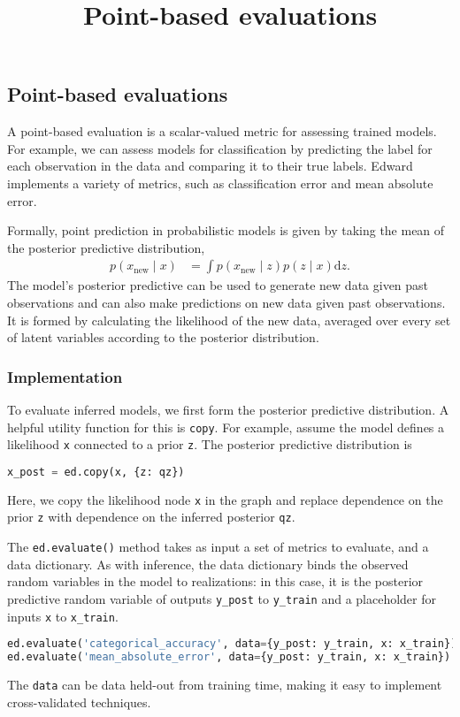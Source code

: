 \title{Point-based evaluations}

\subsection{Point-based evaluations}

A point-based evaluation is a scalar-valued metric for assessing
trained models. For example, we can assess models for classification
by predicting the label for each observation in the data and comparing
it to their true labels. Edward implements a variety of metrics, such
as classification error and mean absolute error.

Formally, point prediction in probabilistic models is given by
taking the mean of the posterior predictive distribution,
\begin{align*}
  p(x_\text{new} \mid x)
  &=
  \int
  p(x_\text{new} \mid z)
  p(z \mid x)
  \text{d} z.
\end{align*}
The model's posterior predictive can be used to generate new data
given past observations and can also make predictions on new data
given past observations.
It is formed by calculating the likelihood of the new data, averaged
over every set of latent variables according to the posterior
distribution.

\subsubsection{Implementation}

To evaluate inferred models, we first form the posterior
predictive distribution. A helpful utility function for this is
\texttt{copy}. For example,
assume the model defines a likelihood \texttt{x} connected to a prior
\texttt{z}. The posterior predictive distribution is
\begin{lstlisting}[language=Python]
x_post = ed.copy(x, {z: qz})
\end{lstlisting}
Here, we copy the likelihood node \texttt{x} in the graph and replace dependence
on the prior \texttt{z} with dependence on the inferred posterior \texttt{qz}.

The \texttt{ed.evaluate()} method takes as input a set of metrics to
evaluate, and a data dictionary. As with inference, the data dictionary binds the
observed random variables in the model to realizations: in this case,
it is the posterior predictive random variable of outputs \texttt{y_post} to
\texttt{y_train} and a placeholder for inputs \texttt{x} to
\texttt{x_train}.
\begin{lstlisting}[language=Python]
ed.evaluate('categorical_accuracy', data={y_post: y_train, x: x_train})
ed.evaluate('mean_absolute_error', data={y_post: y_train, x: x_train})
\end{lstlisting}
The \texttt{data} can be data held-out from training time, making it
easy to implement cross-validated techniques.

